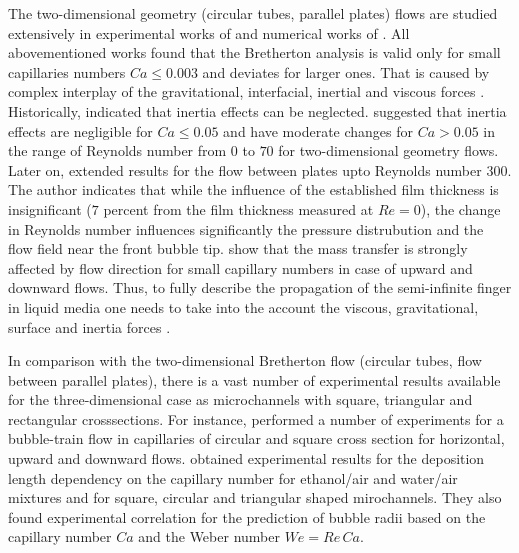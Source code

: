 \documentclass{article}
\begin{document}
The two-dimensional geometry (circular tubes, parallel plates) flows are studied extensively in
experimental works of \citet{aussillous-deposition, cerro-bubble-train} and numerical works of
\citet{giavedoni-numerical,heil-bretherton}. All abovementioned works found that the Bretherton
analysis is valid only for small capillaries numbers $Ca\leq 0.003$ and deviates for larger ones.
That is caused by complex interplay of the gravitational,
interfacial, inertial and viscous forces \cite{gupta-review}. Historically, 
\citet{bretherton} indicated that inertia effects can be 
neglected. \citet{giavedoni-numerical} suggested
that
inertia effects
are negligible for $Ca \leq 0.05$ and have moderate changes for $Ca>0.05$ in the range of Reynolds
number from $0$ to $70$ for two-dimensional geometry flows. Later on, \citet{heil-bretherton}
extended
results for the flow between plates upto Reynolds number
$300$. The author indicates that while the influence of the established film thickness is
insignificant
($7$ percent from the film thickness measured at $Re=0$), the change in Reynolds number 
influences significantly the pressure distrubution and the flow field near the front bubble tip.
\citet{cerro-bubble-train} show that the mass transfer is strongly affected by flow direction for
small capillary numbers in case of upward and downward flows. Thus, to fully describe the
propagation of the semi-infinite finger in liquid media one needs to take into the account the
viscous, gravitational, surface and inertia forces \cite{gupta-review}.  

In comparison with the two-dimensional Bretherton flow  (circular tubes, flow between
parallel
plates), there is a vast number of experimental
results available for the three-dimensional case as microchannels with square, triangular and
rectangular crosssections. For instance, \citet{cerro-bubble-train} performed a number of
experiments for a
bubble-train flow in capillaries of
circular and square cross section for horizontal, upward and downward flows.
\citet{shikazono-square} obtained
experimental
results for the deposition length dependency on the
capillary number for ethanol/air and water/air mixtures and for square, circular and triangular
shaped mirochannels. They also found experimental correlation for the prediction of bubble radii
based on the capillary number $Ca$ and the Weber number $We=Re\,Ca$. 
\end{document}

